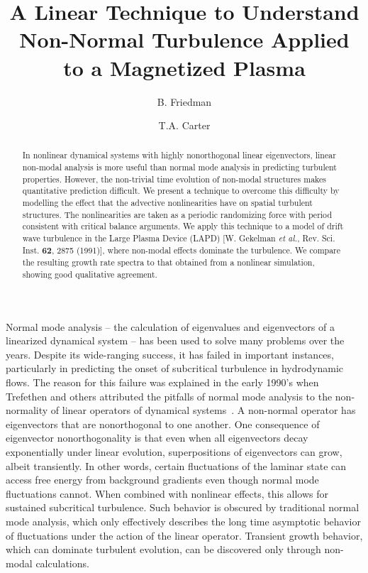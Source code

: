 \documentclass[letter,scriptaddress,twocolumn, prl,showkeys]{revtex4}
\begin{document}
\title{A Linear Technique to Understand Non-Normal Turbulence Applied to a Magnetized Plasma}

\author{B. Friedman}

\author{T.A. Carter}




\begin{abstract}
In nonlinear dynamical systems with highly nonorthogonal linear eigenvectors, linear non-modal analysis is more useful than normal mode analysis in predicting turbulent properties. 
However, the non-trivial time evolution of non-modal structures makes quantitative prediction difficult. We present a technique to overcome this difficulty by modelling the effect that the advective nonlinearities have on spatial turbulent structures. The nonlinearities are taken as a periodic randomizing force with
period consistent with critical balance arguments. We apply this technique to a model of drift wave turbulence in the Large Plasma Device (LAPD) 
[W. Gekelman \emph{et al.}, Rev. Sci. Inst. {\bf 62}, 2875 (1991)], where non-modal effects dominate the turbulence.
We compare the resulting growth rate spectra to that obtained from a nonlinear simulation, showing good qualitative agreement.
\end{abstract}

\maketitle

Normal mode analysis -- the calculation of eigenvalues and eigenvectors of a linearized dynamical system -- has been used to solve many problems over the years.
Despite its wide-ranging success, it has failed in important instances, particularly in predicting the onset of subcritical turbulence in hydrodynamic flows. 
The reason for this failure was explained in the early 1990's when Trefethen and others attributed the pitfalls of normal mode analysis to the non-normality of linear operators of
dynamical systems~\cite{trefethen1993,schmid2007}. A non-normal operator has 
eigenvectors that are nonorthogonal to one another. One consequence of eigenvector nonorthogonality is that even when all eigenvectors decay exponentially under linear evolution, 
superpositions of eigenvectors can grow, albeit transiently.
In other words, certain fluctuations of the laminar state can access free energy from background gradients even though normal mode fluctuations cannot.
When combined with nonlinear effects, this allows for sustained subcritical turbulence.
Such behavior is obscured by traditional normal mode analysis, which only effectively describes the long time asymptotic behavior of fluctuations under the 
action of the linear operator. Transient growth behavior, which can dominate turbulent evolution, can be discovered only through non-modal calculations.
\end{document}
